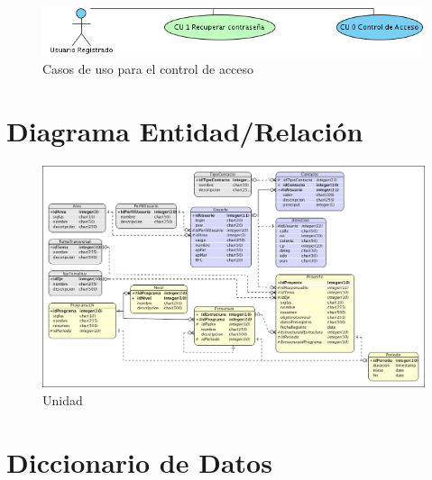 \documentclass[10pt]{book}
\begin{document}
\begin{figure}[htbp!]
	\begin{center}
		\includegraphics[width=.3\textwidth]{images/CUcontrolAcceso}
		\caption{Casos de uso para el control de acceso}
		\label{fig:default}
	\end{center}
\end{figure}




\section{Diagrama Entidad/Relación}

  	\begin{figure}[h!]
 		\centering
 			\includegraphics[width=.8\textwidth]{images/modeloER}
 		\caption{Unidad}
 	\end{figure}

\section{Diccionario de Datos}

\end{document}
